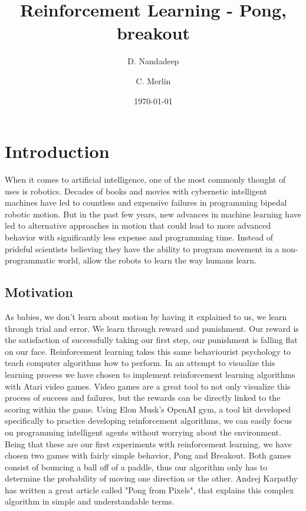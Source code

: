 \documentclass[%
 aip,
 jmp,%
 amsmath,amssymb,
 reprint,%
]{revtex4-1}
\begin{document}
\title[CS 445/545 Machine learning]{Reinforcement Learning - Pong, breakout}%

\author{D. Nandadeep}
\author{C. Merlin}%


\date{\today}%

\maketitle


\section{\label{sec:level1}Introduction}

When it comes to artificial intelligence, one of the most commonly thought of uses is robotics. Decades of books and movies with cybernetic intelligent machines have led to countless and expensive failures in programming bipedal robotic motion. But in the past few years, new advances in machine learning have led to alternative approaches in motion that could lead to more advanced behavior with significantly less expense and programming time. Instead of prideful scientists believing they have the ability to program movement in a non-programmatic world, allow the robots to learn the way humans learn.
\vspace{-10pt}
\subsection{Motivation}

As babies, we don't learn about motion by having it explained to us, we learn through trial and error. We learn through reward and punishment. Our reward is the satisfaction of successfully taking our first step, our punishment is falling flat on our face. Reinforcement learning takes this same behaviourist psychology to teach computer algorithms how to perform. In an attempt to visualize this learning process we have chosen to implement reinforcement learning algorithms with Atari video games. 
Video games are a great tool to not only visualize this process of success and failures, but the rewards can be directly linked to the scoring within the game. Using Elon Musk's OpenAI gym, a tool kit developed specifically to practice developing reinforcement algorithms, we can easily focus on programming intelligent agents without worrying about the environment. Being that these are our first experiments with reinforcement learning, we have chosen two games with fairly simple behavior, Pong and Breakout. Both games consist of bouncing a ball off of a paddle, thus our algorithm only has to determine the probability of moving one direction or the other.  Andrej Karpathy has written a great article called "Pong from Pixels", that explains this complex algorithm in simple and understandable terms. 
\end{document}
